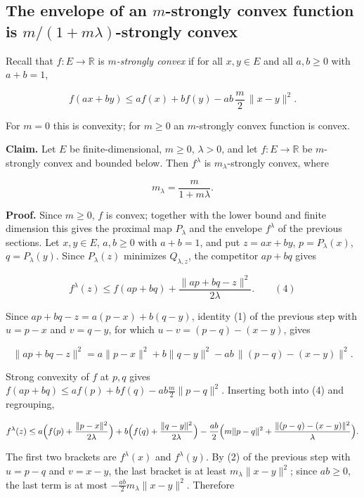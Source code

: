 \documentclass[11pt,a4paper]{report}
\begin{document}
\subsection{\texorpdfstring{The envelope of an \(m\)-strongly convex function is \(m/(1+m\lambda)\)-strongly convex}{The envelope of an m-strongly convex function is m/(1+mλ)-strongly convex}}
\label{report-step-ProximalLangevin-StrongMoreau-lean-2}


Recall that \(f:E\to\mathbb R\) is \emph{\(m\)-strongly convex} if for all \(x,y\in E\) and all \(a,b\ge0\) with \(a+b=1\),


\[f(ax+by)\le af(x)+bf(y)-ab\,\frac m2\,\|x-y\|^2.\]


For \(m=0\) this is convexity; for \(m\ge0\) an \(m\)-strongly convex function is convex.




\textbf{Claim.} Let \(E\) be finite-dimensional, \(m\ge0\), \(\lambda>0\), and let \(f:E\to\mathbb R\) be \(m\)-strongly convex and bounded below. Then \(f^\lambda\) is \(m_\lambda\)-strongly convex, where


\[m_\lambda=\frac{m}{1+m\lambda}.\]


\textbf{Proof.} Since \(m\ge0\), \(f\) is convex; together with the lower bound and finite dimension this gives the proximal map \(P_\lambda\) and the envelope \(f^\lambda\) of the previous sections. Let \(x,y\in E\), \(a,b\ge0\) with \(a+b=1\), and put \(z=ax+by\), \(p=P_\lambda(x)\), \(q=P_\lambda(y)\). Since \(P_\lambda(z)\) minimizes \(Q_{\lambda,z}\), the competitor \(ap+bq\) gives


\[f^\lambda(z)\le f(ap+bq)+\frac{\|ap+bq-z\|^2}{2\lambda}.\qquad(4)\]


Since \(ap+bq-z=a(p-x)+b(q-y)\), identity (1) of the previous step with \(u=p-x\) and \(v=q-y\), for which \(u-v=(p-q)-(x-y)\), gives


\[\|ap+bq-z\|^2=a\|p-x\|^2+b\|q-y\|^2-ab\,\|(p-q)-(x-y)\|^2.\]


Strong convexity of \(f\) at \(p,q\) gives \(f(ap+bq)\le af(p)+bf(q)-ab\frac m2\|p-q\|^2\). Inserting both into (4) and regrouping,


\[f^\lambda(z)\le a\Bigl(f(p)+\frac{\|p-x\|^2}{2\lambda}\Bigr)+b\Bigl(f(q)+\frac{\|q-y\|^2}{2\lambda}\Bigr)-\frac{ab}{2}\Bigl(m\|p-q\|^2+\frac{\|(p-q)-(x-y)\|^2}{\lambda}\Bigr).\]


The first two brackets are \(f^\lambda(x)\) and \(f^\lambda(y)\). By (2) of the previous step with \(u=p-q\) and \(v=x-y\), the last bracket is at least \(m_\lambda\|x-y\|^2\); since \(ab\ge0\), the last term is at most \(-\frac{ab}{2}m_\lambda\|x-y\|^2\). Therefore
\end{document}

